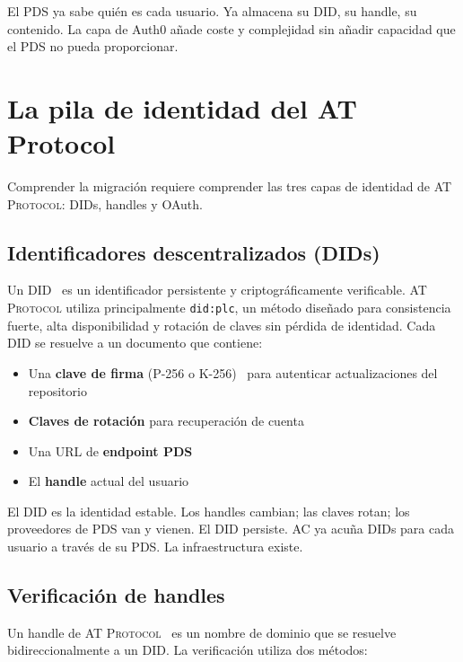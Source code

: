 \documentclass[10pt,letterpaper,twocolumn]{article}
\newcommand{\atproto}{\textsc{AT Protocol}}
\begin{document}
El PDS ya sabe quién es cada usuario. Ya almacena su DID, su handle, su contenido. La capa de Auth0 añade coste y complejidad sin añadir capacidad que el PDS no pueda proporcionar.


\section{La pila de identidad del AT Protocol}
\label{sec:atproto}

Comprender la migración requiere comprender las tres capas de identidad de \atproto{}: DIDs, handles y OAuth.

\subsection{Identificadores descentralizados (DIDs)}

Un DID~\citep{w3cdid2022, atproto2024did} es un identificador persistente y criptográficamente verificable. \atproto{} utiliza principalmente \texttt{did:plc}, un método diseñado para consistencia fuerte, alta disponibilidad y rotación de claves sin pérdida de identidad. Cada DID se resuelve a un documento que contiene:

\begin{itemize}
  \item Una \textbf{clave de firma} (P-256 o K-256)~\citep{atproto2024crypto} para autenticar actualizaciones del repositorio
  \item \textbf{Claves de rotación} para recuperación de cuenta
  \item Una URL de \textbf{endpoint PDS}
  \item El \textbf{handle} actual del usuario
\end{itemize}

El DID es la identidad estable. Los handles cambian; las claves rotan; los proveedores de PDS van y vienen. El DID persiste. AC ya acuña DIDs para cada usuario a través de su PDS. La infraestructura existe.

\subsection{Verificación de handles}

Un handle de \atproto{}~\citep{atproto2024handle} es un nombre de dominio que se resuelve bidireccionalmente a un DID. La verificación utiliza dos métodos:
\end{document}
